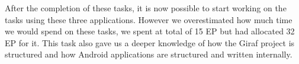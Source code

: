  After the completion of these tasks, it is now possible to start working on the tasks using these three applications. 
 However we overestimated how much time we would spend on these tasks, we spent at total of 15 EP but had allocated 32 EP for it. 
 This task also gave us a deeper knowledge of how the Giraf project is structured and how Android applications are structured and written internally. 
